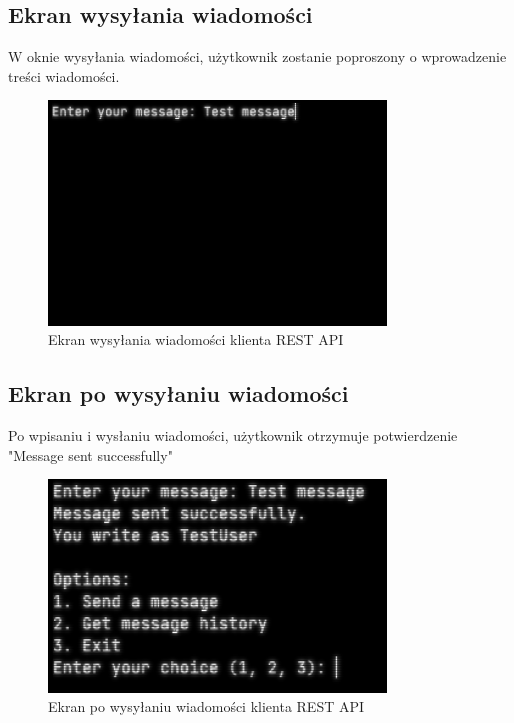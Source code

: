 \subsection{Ekran wysyłania wiadomości}
\begin{spacing}{1.5} %
\end{spacing} %
    W oknie wysyłania wiadomości, użytkownik zostanie poproszony o wprowadzenie treści wiadomości. 
    \begin{figure}[ht]
        \centering
        \noindent\hspace*{-2.1cm} %
        \includegraphics[width=0.8\textwidth]{assets/client_message.png}
        \caption{Ekran wysyłania wiadomości klienta REST API}
        \label{fig:client_message}
    \end{figure}

\subsection{Ekran po wysyłaniu wiadomości}
\begin{spacing}{1.5} %
    Po wpisaniu i wysłaniu wiadomości, użytkownik otrzymuje potwierdzenie "Message sent successfully"
        \begin{figure}[ht]
        \centering
        \noindent\hspace*{-2.1cm} %
        \includegraphics[width=0.8\textwidth]{assets/client_after_message.png}
        \caption{Ekran po wysyłaniu wiadomości klienta REST API}
        \label{fig:client_after_message}
    \end{figure}
\end{spacing} %

